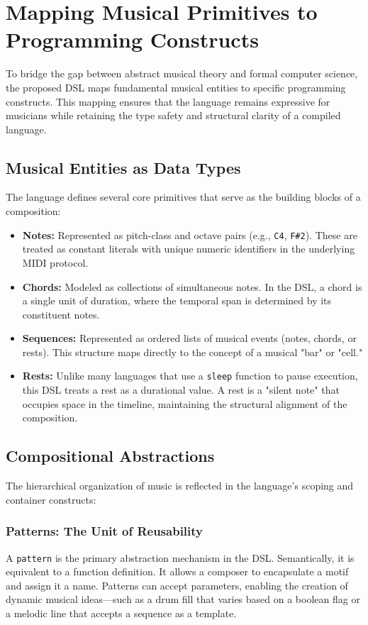 \section{Mapping Musical Primitives to Programming Constructs}\label{sec:musical-mapping}

To bridge the gap between abstract musical theory and formal computer science, the proposed DSL maps
fundamental musical entities to specific programming constructs.
This mapping ensures that the language remains expressive for musicians while retaining the type safety and
structural clarity of a compiled language.

\subsection{Musical Entities as Data Types}

The language defines several core primitives that serve as the building blocks of a composition:
\begin{itemize}
  \item \textbf{Notes:} Represented as pitch-class and octave pairs (e.g., \texttt{C4}, \texttt{F\#2}). These
    are treated as constant literals with unique numeric identifiers in the underlying MIDI protocol.
  \item \textbf{Chords:} Modeled as collections of simultaneous notes. In the DSL, a chord is a single unit
    of duration, where the temporal span is determined by its constituent notes.
  \item \textbf{Sequences:} Represented as ordered lists of musical events (notes, chords, or rests). This
    structure maps directly to the concept of a musical "bar" or "cell."
  \item \textbf{Rests:} Unlike many languages that use a \texttt{sleep} function to pause execution, this DSL
    treats a rest as a durational value. A rest is a "silent note" that occupies space in the timeline,
    maintaining the structural alignment of the composition.
\end{itemize}

\subsection{Compositional Abstractions}

The hierarchical organization of music is reflected in the language's scoping and container constructs:

\subsubsection{Patterns: The Unit of Reusability}
A \texttt{pattern} is the primary abstraction mechanism in the DSL.
Semantically, it is equivalent to a function definition.
It allows a composer to encapsulate a motif and assign it a name.
Patterns can accept parameters, enabling the creation of dynamic musical ideas—such as a drum fill that
varies based on a boolean flag or a melodic line that accepts a sequence as a template.


